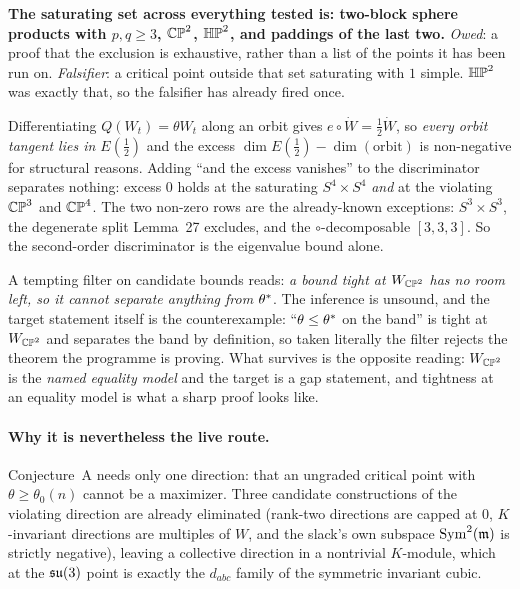 \textbf{The saturating set across everything tested is: two-block sphere products with $p,q\ge3$, $\mathbb{CP}^2$, $\mathbb{HP}^2$, and paddings of the last two.} \emph{Owed}: a proof that the exclusion is exhaustive, rather than a list of the points it has been run on. \emph{Falsifier}: a critical point outside that set saturating with $1$ simple. $\mathbb{HP}^2$ was exactly that, so the falsifier has already fired once.

\begin{remarkstar}
Differentiating $Q(W_t)=\theta W_t$ along an orbit gives $e\circ\dot W=\tfrac12\dot W$, so \emph{every orbit tangent lies in $E(\tfrac12)$} and the excess $\dim E(\tfrac12)-\dim(\text{orbit})$ is non-negative for structural reasons. Adding ``and the excess vanishes'' to the discriminator separates nothing: excess $0$ holds at the saturating $S^4\times S^4$ \emph{and} at the violating $\mathbb{CP}^3$ and $\mathbb{CP}^4$. The two non-zero rows are the already-known exceptions: $S^3\times S^3$, the degenerate split Lemma~27 excludes, and the $\circ$-decomposable $[3,3,3]$. So the second-order discriminator is the eigenvalue bound alone.
\end{remarkstar}

\begin{remarkstar}
A tempting filter on candidate bounds reads: \emph{a bound tight at $W_{\mathbb{CP}^2}$ has no room left, so it cannot separate anything from $\theta^{*}$}. The inference is unsound, and the target statement itself is the counterexample: ``$\theta\le\theta^{*}$ on the band'' is tight at $W_{\mathbb{CP}^2}$ and separates the band by definition, so taken literally the filter rejects the theorem the programme is proving. What survives is the opposite reading: $W_{\mathbb{CP}^2}$ is the \emph{named equality model} and the target is a gap statement, and tightness at an equality model is what a sharp proof looks like.
\end{remarkstar}

\paragraph{Why it is nevertheless the live route.} Conjecture~A needs only one direction: that an ungraded critical point with $\theta\ge\theta_0(n)$ cannot be a maximizer. Three candidate constructions of the violating direction are already eliminated (rank-two directions are capped at $0$, $K$-invariant directions are multiples of $W$, and the slack's own subspace $\mathrm{Sym}^2(\mathfrak{m})$ is strictly negative), leaving a collective direction in a nontrivial $K$-module, which at the $\mathfrak{su}(3)$ point is exactly the $d_{abc}$ family of the symmetric invariant cubic.

